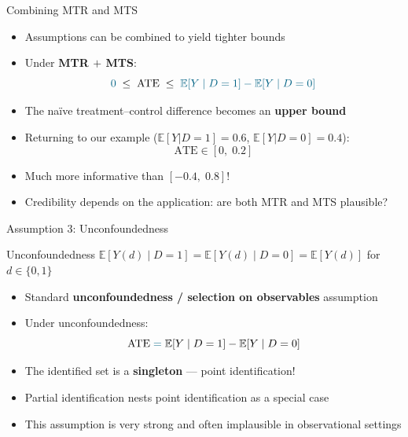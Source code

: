 \documentclass[10pt]{beamer}
\newcommand{\E}{\mathbb{E}}
\begin{document}
\begin{frame}{Combining MTR and MTS}
  \begin{itemize}
    \item Assumptions can be combined to yield tighter bounds
    \item Under \textbf{MTR $+$ MTS}:
      $$
        \textcolor{hanada}{0} \;\leq\; \text{ATE} \;\leq\; \textcolor{hanada}{\E[Y \mid D=1] - \E[Y \mid D=0]}
      $$
    \item The na\"ive treatment--control difference becomes an \textbf{upper bound}
    \item Returning to our example ($\E[Y|D=1]=0.6$, $\E[Y|D=0]=0.4$):
      $$
        \text{ATE} \in [0,\; 0.2]
      $$
    \item Much more informative than $[-0.4,\; 0.8]$!
    \item Credibility depends on the application: are both MTR and MTS plausible?
  \end{itemize}
\end{frame}

\begin{frame}{Assumption 3: Unconfoundedness}
  \begin{block}{Unconfoundedness}
    $\E[Y(d) \mid D=1] = \E[Y(d) \mid D=0] = \E[Y(d)]$ for $d \in \{0,1\}$
  \end{block}
  \begin{itemize}
    \item Standard \textbf{unconfoundedness / selection on observables} assumption
    \item Under unconfoundedness:
      $$
        \text{ATE} \; \textcolor{hanada}{=}\; \E[Y \mid D=1] - \E[Y \mid D=0]
      $$
    \item The identified set is a \textbf{singleton} --- point identification!
    \item Partial identification nests point identification as a special case
    \item This assumption is very strong and often implausible in observational settings
  \end{itemize}
\end{frame}

\end{document}
